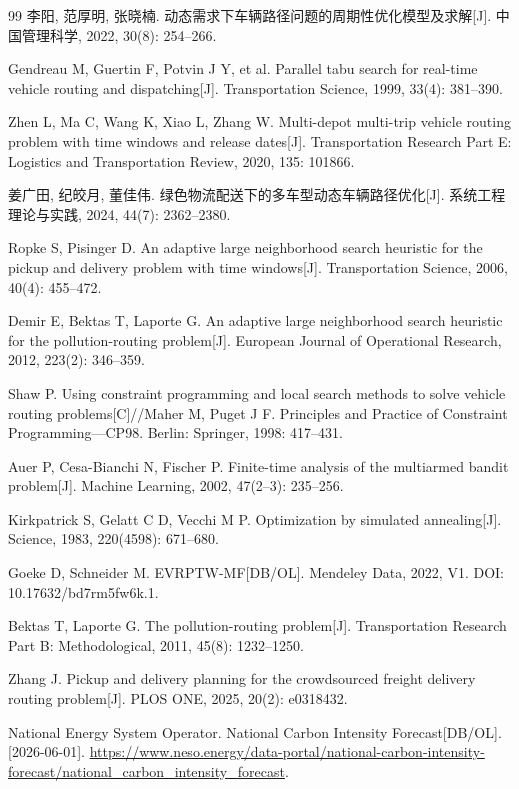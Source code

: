 \documentclass{setp-new}
\begin{document}
\begin{thebibliography}{99}
 李阳, 范厚明, 张晓楠. 动态需求下车辆路径问题的周期性优化模型及求解[J]. 中国管理科学, 2022, 30(8): 254--266.

 Gendreau M, Guertin F, Potvin J Y, et al. Parallel tabu search for real-time vehicle routing and dispatching[J]. Transportation Science, 1999, 33(4): 381--390.

 Zhen L, Ma C, Wang K, Xiao L, Zhang W. Multi-depot multi-trip vehicle routing problem with time windows and release dates[J]. Transportation Research Part E: Logistics and Transportation Review, 2020, 135: 101866.

 姜广田, 纪皎月, 董佳伟. 绿色物流配送下的多车型动态车辆路径优化[J]. 系统工程理论与实践, 2024, 44(7): 2362--2380.

 Ropke S, Pisinger D. An adaptive large neighborhood search heuristic for the pickup and delivery problem with time windows[J]. Transportation Science, 2006, 40(4): 455--472.

 Demir E, Bektas T, Laporte G. An adaptive large neighborhood search heuristic for the pollution-routing problem[J]. European Journal of Operational Research, 2012, 223(2): 346--359.

 Shaw P. Using constraint programming and local search methods to solve vehicle routing problems[C]//Maher M, Puget J F. Principles and Practice of Constraint Programming---CP98. Berlin: Springer, 1998: 417--431.

 Auer P, Cesa-Bianchi N, Fischer P. Finite-time analysis of the multiarmed bandit problem[J]. Machine Learning, 2002, 47(2--3): 235--256.

 Kirkpatrick S, Gelatt C D, Vecchi M P. Optimization by simulated annealing[J]. Science, 1983, 220(4598): 671--680.

 Goeke D, Schneider M. EVRPTW-MF[DB/OL]. Mendeley Data, 2022, V1. DOI: 10.17632/bd7rm5fw6k.1.

 Bektas T, Laporte G. The pollution-routing problem[J]. Transportation Research Part B: Methodological, 2011, 45(8): 1232--1250.

 Zhang J. Pickup and delivery planning for the crowdsourced freight delivery routing problem[J]. PLOS ONE, 2025, 20(2): e0318432.

 National Energy System Operator. National Carbon Intensity Forecast[DB/OL]. [2026-06-01]. \url{https://www.neso.energy/data-portal/national-carbon-intensity-forecast/national_carbon_intensity_forecast}.


\end{thebibliography}
\end{document}
